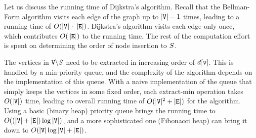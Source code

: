 Let us discuss the running time of Dijkstra's algorithm. Recall that the Bellman-Form algorithm visits each edge of the graph up to $|{\tt V}|-1$ times, leading to a running time of $O(|{\tt V}|\, \cdot \,|{\tt E}|)$. Dijkstra's algorithm visits each edge only once, which contributes $O(\,|{\tt E}|)$ to the running time. The rest of the computation effort is spent on determining the order of node insertion to ${S}$.

The vertices in ${\tt V}\backslash {S}$ need to be extracted in increasing order of $d[{\tt v}]$.  This is handled by a min-priority queue, and the complexity of the algorithm depends on the implementation of this queue.
With a naive implementation of the queue that simply keeps the vertices in some fixed order, each extract-min operation takes  $O(|{\tt V}|)$ time, leading to overall running time of $O(|{\tt V}{|^2} + |{\tt E}|)$ for the algorithm. Using a basic (binary heap) priority queue brings the running time to $O((|{\tt V}| + |{\tt E}|)\log |{\tt V}|)$, and a more sophisticated one (Fibonacci heap) can bring it down to  $O(|{\tt V}|\log |{\tt V}| + |{\tt E}|)$.



